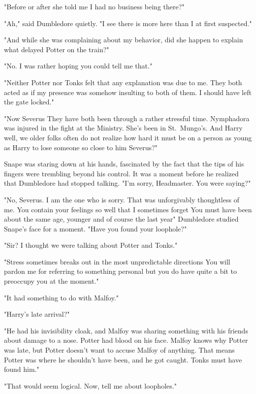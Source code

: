 "Before or after she told me I had no business being there?"

"Ah," said Dumbledore quietly. "I see there is more here than I at first suspected."

"And while she was complaining about my behavior, did she happen to explain what delayed Potter on the train?"

"No. I was rather hoping you could tell me that."

"Neither Potter nor Tonks felt that any explanation was due to me. They both acted as if my presence was somehow insulting to both of them. I should have left the gate locked."

"Now Severus{\el} They have both been through a rather stressful time. Nymphadora was injured in the fight at the Ministry. She's been in St.~Mungo's. And Harry{\el} well, we older folks often do not realize how hard it must be on a person as young as Harry to lose someone so close to him{\el} Severus?"

Snape was staring down at his hands, fascinated by the fact that the tips of his fingers were trembling beyond his control. It was a moment before he realized that Dumbledore had stopped talking. "I'm sorry, Headmaster. You were saying?"

"No, Severus. I am the one who is sorry. That was unforgivably thoughtless of me. You contain your feelings so well that I sometimes forget{\el} You must have been about the same age, younger{\el} and of course the last year{\el}" Dumbledore studied Snape's face for a moment. "Have you found your loophole?"

"Sir? I thought we were talking about Potter and Tonks."

"Stress sometimes breaks out in the most unpredictable directions{\el} You will pardon me for referring to something personal{\el} but you do have quite a bit to preoccupy you at the moment."

"It had something to do with Malfoy."

"Harry's late arrival?"

"He had his invisibility cloak, and Malfoy was sharing something with his friends about damage to a nose. Potter had blood on his face. Malfoy knows why Potter was late, but Potter doesn't want to accuse Malfoy of anything. That means Potter was where he shouldn't have been, and he got caught. Tonks must have found him."

"That would seem logical. Now, tell me about loopholes."


